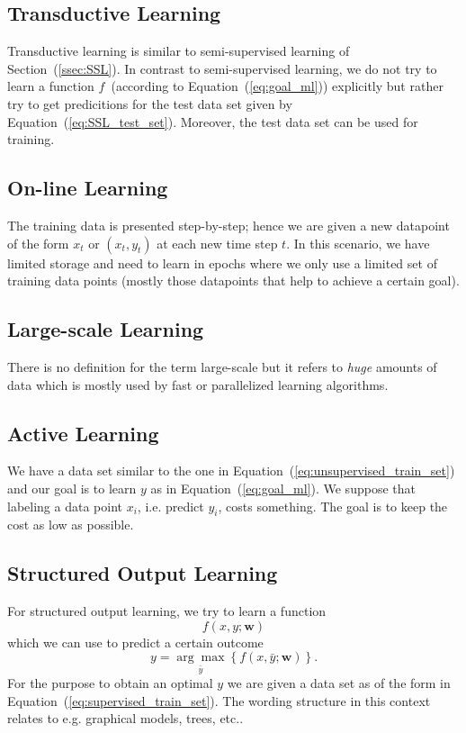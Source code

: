 \subsection{Transductive Learning}
Transductive learning is similar to semi-supervised learning of Section~(\ref{ssec:SSL}). %
In contrast to semi-supervised learning, we do not try to learn a function $f$~(according to Equation~(\ref{eq:goal_ml})) explicitly but rather try to get predicitions for the test data set given by Equation~(\ref{eq:SSL_test_set}). %
Moreover, the test data set can be used for training. %
%
%
%
\subsection{On-line Learning}
The training data is presented step-by-step; hence we are given a new datapoint of the form $x_t$ or $(x_t,y_t)$ at each new time step $t$. %
In this scenario, we have limited storage and need to learn in epochs where we only use a limited set of training data points (mostly those datapoints that help to achieve a certain goal). %
%
%
%
\subsection{Large-scale Learning}
There is no definition for the term large-scale but it refers to \textit{huge} amounts of data which is mostly used by fast or parallelized learning algorithms. %
%
%
%
\subsection{Active Learning}
We have a data set similar to the one in Equation~(\ref{eq:unsupervised_train_set}) and our goal is to learn $y$ as in Equation~(\ref{eq:goal_ml}). %
We suppose that labeling a data point $x_i$, i.e. predict $y_i$, costs something. %
The goal is to keep the cost as low as possible. %
%
%
%
\subsection{Structured Output Learning}
For structured output learning, we try to learn a function %
\begin{equation}
f(x,y;\mathbf{w})
\label{eq:goal_structured_output_learning}
\end{equation}%
which we can use to predict a certain outcome %
\begin{equation}
y = \underset{\bar{y}}{\arg\max} \left\{ f(x,\bar{y};\mathbf{w}) \right\}.
\end{equation}
For the purpose to obtain an optimal $y$ we are given a data set as of the form in Equation~(\ref{eq:supervised_train_set}). %
The wording structure in this context relates to e.g. graphical models, trees, etc.. %
%
%
%
